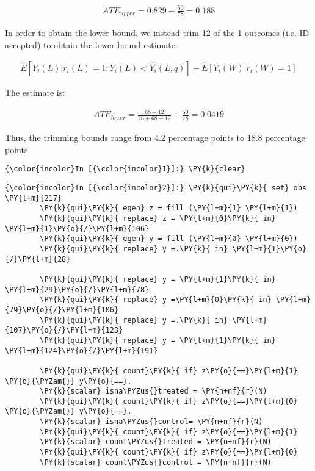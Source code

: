 \documentclass[11pt,notitlepage]{article}\usepackage[]{graphicx}\usepackage[]{color}
\makeatletter
\newenvironment{kframe}{%
 \def\at@end@of@kframe{}%
 \ifinner\ifhmode%
  \def\at@end@of@kframe{\end{minipage}}%
  \begin{minipage}{\columnwidth}%
 \fi\fi%
 \def\FrameCommand##1{\hskip\@totalleftmargin \hskip-\fboxsep
 \colorbox{shadecolor}{##1}\hskip-\fboxsep
     \hskip-\linewidth \hskip-\@totalleftmargin \hskip\columnwidth}%
 \MakeFramed {\advance\hsize-\width
   \@totalleftmargin\z@ \linewidth\hsize
   \@setminipage}}%
 {\par\unskip\endMakeFramed%
 \at@end@of@kframe}
\newenvironment{knitrout}{}{} %
\makeatother
\begin{document}
\begin{enumerate}[a)]
\begin{align*}
ATE_{upper} = 0.829 - \frac{50}{78} = 0.188
\end{align*}

In order to obtain the lower bound, we instead trim 12 of the 1 outcomes (i.e. ID accepted) to obtain the lower bound estimate:

\begin{align*}
\hat{E}[Y_i(L)|r_i(L)=1; Y_i(L) < \hat{Y_i}(L,q)] - \hat{E}[Y_i(W) | r_i(W)=1]
\end{align*}

The estimate is:

\begin{align*}
ATE_{lower} =\frac{68-12}{26+68-12} - \frac{50}{78} = 0.0419
\end{align*}

Thus, the trimming bounds range from 4.2 percentage points to 18.8 percentage points.

\begin{knitrout}
\color{fgcolor}\begin{kframe}

    \begin{Verbatim}[commandchars=\\\{\}]
{\color{incolor}In [{\color{incolor}1}]:} \PY{k}{clear}
\end{Verbatim}

    \begin{Verbatim}[commandchars=\\\{\}]
{\color{incolor}In [{\color{incolor}2}]:} \PY{k}{qui}\PY{k}{ set} obs \PY{l+m}{217}
        \PY{k}{qui}\PY{k}{ egen} z = fill (\PY{l+m}{1} \PY{l+m}{1})
        \PY{k}{qui}\PY{k}{ replace} z = \PY{l+m}{0}\PY{k}{ in} \PY{l+m}{1}\PY{o}{/}\PY{l+m}{106}
        \PY{k}{qui}\PY{k}{ egen} y = fill (\PY{l+m}{0} \PY{l+m}{0})
        \PY{k}{qui}\PY{k}{ replace} y =.\PY{k}{ in} \PY{l+m}{1}\PY{o}{/}\PY{l+m}{28}
        
        \PY{k}{qui}\PY{k}{ replace} y = \PY{l+m}{1}\PY{k}{ in} \PY{l+m}{29}\PY{o}{/}\PY{l+m}{78}
        \PY{k}{qui}\PY{k}{ replace} y =\PY{l+m}{0}\PY{k}{ in} \PY{l+m}{79}\PY{o}{/}\PY{l+m}{106}
        \PY{k}{qui}\PY{k}{ replace} y =.\PY{k}{ in} \PY{l+m}{107}\PY{o}{/}\PY{l+m}{123}
        \PY{k}{qui}\PY{k}{ replace} y = \PY{l+m}{1}\PY{k}{ in} \PY{l+m}{124}\PY{o}{/}\PY{l+m}{191}
        
        \PY{k}{qui}\PY{k}{ count}\PY{k}{ if} z\PY{o}{==}\PY{l+m}{1} \PY{o}{\PYZam{}} y\PY{o}{==}.
        \PY{k}{scalar} isna\PYZus{}treated = \PY{n+nf}{r}(N)
        \PY{k}{qui}\PY{k}{ count}\PY{k}{ if} z\PY{o}{==}\PY{l+m}{0} \PY{o}{\PYZam{}} y\PY{o}{==}.
        \PY{k}{scalar} isna\PYZus{}control= \PY{n+nf}{r}(N)
        \PY{k}{qui}\PY{k}{ count}\PY{k}{ if} z\PY{o}{==}\PY{l+m}{1}
        \PY{k}{scalar} count\PYZus{}treated = \PY{n+nf}{r}(N)
        \PY{k}{qui}\PY{k}{ count}\PY{k}{ if} z\PY{o}{==}\PY{l+m}{0}
        \PY{k}{scalar} count\PYZus{}control = \PY{n+nf}{r}(N)
        

\end{Verbatim}
\end{kframe}
\end{knitrout}
\end{enumerate}
\end{document}
